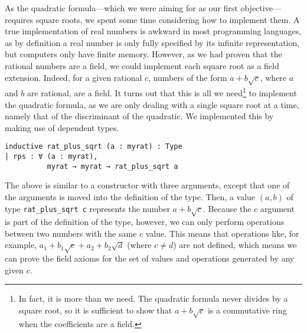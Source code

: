 \documentclass{article} %
\theoremstyle{plain}
\theoremstyle{definition}
\begin{document}
As the quadratic formula---which we were aiming for as our first objective---requires square roots, we spent some time considering how to implement them.  
A true implementation of real numbers is awkward in most programming languages,
as by definition a real number is only fully specified by its infinite representation, but computers only have finite memory.  
However, as we had proven that the rational numbers are a field, we could implement each square root as a field extension.
Indeed, for a given rational $c$, numbers of the form $a + b\sqrt{c}$, where $a$ and $b$ are rational, are a field.  
It turns out that this is all we need\footnote{In fact, it is more than we need.
The quadratic formula never divides by a square root, so it is sufficient to show that $a + b\sqrt{c}$ is a commutative ring when the coefficients are a field.}
to implement the quadratic formula,
as we are only dealing with a single square root at a time,
namely that of the discriminant of the quadratic.
We implemented this by making use of dependent types.
\begin{lstlisting}
inductive rat_plus_sqrt (a : myrat) : Type
| rps : ∀ (a : myrat), 
          myrat → myrat → rat_plus_sqrt a
\end{lstlisting}

The above is similar to a constructor with three arguments, except that one of the arguments is moved into the definition of the type.  
Then, a value $(a, b)$ of type \lstinline!rat_plus_sqrt c! represents the number $a + b\sqrt{c}$.  
Because the $c$ argument is part of the definition of the type, however, we can only perform operations between two numbers with the same $c$ value.  
This means that operations like, for example, $a_1 + b_1\sqrt{c} + a_2 + b_2\sqrt{d}$ (where $c \ne d$) are not defined,
which means we can prove the field axioms for the set of values and operations generated by any given $c$.  
\end{document}
